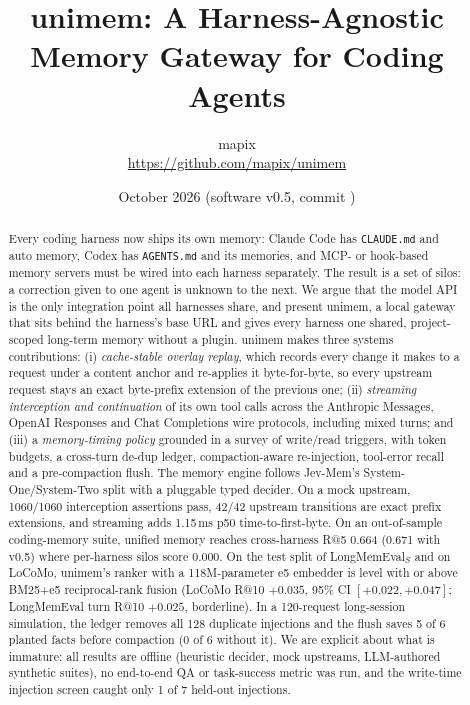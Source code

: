 \documentclass[10pt,twocolumn]{article}
\title{\textbf{unimem: A Harness-Agnostic Memory Gateway for Coding Agents}}
\author{mapix\\ \small\url{https://github.com/mapix/unimem}}
\date{October 2026 \quad (software v0.5, commit \code{7c8742a})}
\newcommand{\sys}{\textsf{unimem}}
\newcommand{\code}[1]{\texttt{\small #1}}
\begin{document}
\maketitle

\begin{abstract}
Every coding harness now ships its own memory: Claude Code has \code{CLAUDE.md} and auto memory, Codex has
\code{AGENTS.md} and its memories, and MCP- or hook-based memory servers must be wired into each harness separately.
The result is a set of silos: a correction given to one agent is unknown to the next. We argue that the model API is
the only integration point all harnesses share, and present \sys{}, a local gateway that sits behind the harness's
base URL and gives every harness one shared, project-scoped long-term memory without a plugin. \sys{} makes three
systems contributions: (i) \emph{cache-stable overlay replay}, which records every change it makes to a request
under a content anchor and re-applies it byte-for-byte, so every upstream request stays an exact byte-prefix extension of the previous one;
(ii) \emph{streaming interception and continuation} of its own tool calls across the Anthropic Messages, OpenAI
Responses and Chat Completions wire protocols, including mixed turns; and (iii) a \emph{memory-timing policy}
grounded in a survey of write/read triggers, with token budgets, a cross-turn de-dup ledger, compaction-aware
re-injection, tool-error recall and a pre-compaction flush. The memory engine follows Jev-Mem's System-One/System-Two
split with a pluggable typed decider. On a mock upstream, 1060/1060 interception assertions pass, 42/42 upstream
transitions are exact prefix extensions, and streaming adds 1.15\,ms p50 time-to-first-byte. On an out-of-sample
coding-memory suite, unified memory reaches cross-harness R@5 0.664 (0.671 with v0.5) where per-harness silos score 0.000. On the
test split of LongMemEval$_S$ and on LoCoMo, \sys{}'s ranker with a 118M-parameter e5 embedder is level with or
above BM25+e5 reciprocal-rank fusion (LoCoMo R@10 $+0.035$, 95\% CI $[+0.022,+0.047]$; LongMemEval turn R@10
$+0.025$, borderline). In a 120-request long-session simulation, the ledger removes all 128 duplicate injections
and the flush saves 5 of 6 planted facts before compaction (0 of 6 without it). We are explicit about what is
immature: all results are offline (heuristic decider, mock upstreams, LLM-authored synthetic suites), no
end-to-end QA or task-success metric was run, and the write-time injection screen caught only 1 of 7 held-out
injections.
\end{abstract}
\end{document}

